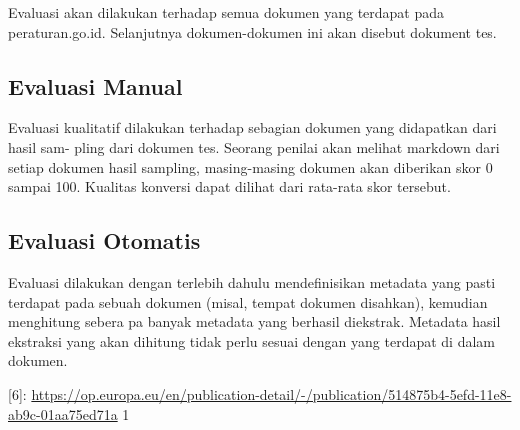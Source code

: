 Evaluasi akan dilakukan terhadap semua dokumen yang terdapat pada
peraturan.go.id. Selanjutnya dokumen-dokumen ini akan disebut dokument
tes.

\subsection{Evaluasi Manual}\label{evaluasi-manual}

Evaluasi kualitatif dilakukan terhadap sebagian dokumen yang didapatkan
dari hasil sam- pling dari dokumen tes. Seorang penilai akan melihat
markdown dari setiap dokumen hasil sampling, masing-masing dokumen akan
diberikan skor 0 sampai 100. Kualitas konversi dapat dilihat dari
rata-rata skor tersebut.

\subsection{Evaluasi Otomatis}\label{evaluasi-otomatis}

Evaluasi dilakukan dengan terlebih dahulu mendefinisikan metadata yang
pasti terdapat pada sebuah dokumen (misal, tempat dokumen disahkan),
kemudian menghitung sebera pa banyak metadata yang berhasil diekstrak.
Metadata hasil ekstraksi yang akan dihitung tidak perlu sesuai dengan
yang terdapat di dalam dokumen.

{[}6{]}:
\url{https://op.europa.eu/en/publication-detail/-/publication/514875b4-5efd-11e8-ab9c-01aa75ed71a}
1
